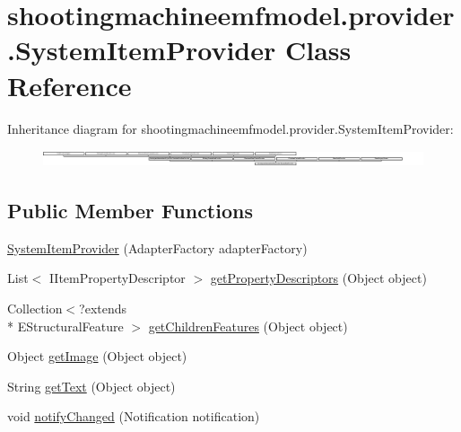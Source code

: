\hypertarget{classshootingmachineemfmodel_1_1provider_1_1_system_item_provider}{\section{shootingmachineemfmodel.\-provider.\-System\-Item\-Provider Class Reference}
\label{classshootingmachineemfmodel_1_1provider_1_1_system_item_provider}
}
Inheritance diagram for shootingmachineemfmodel.\-provider.\-System\-Item\-Provider\-:\begin{figure}[H]
\begin{center}
\leavevmode
\includegraphics[height=0.499109cm]{classshootingmachineemfmodel_1_1provider_1_1_system_item_provider}
\end{center}
\end{figure}
\subsection*{Public Member Functions}
\begin{DoxyCompactItemize}
\item 
\hyperlink{classshootingmachineemfmodel_1_1provider_1_1_system_item_provider_afd774c9d5a71bb4c976f74e50450c78a}{System\-Item\-Provider} (Adapter\-Factory adapter\-Factory)
\item 
List$<$ I\-Item\-Property\-Descriptor $>$ \hyperlink{classshootingmachineemfmodel_1_1provider_1_1_system_item_provider_a311eec6278a73e0b2231071144ada0c0}{get\-Property\-Descriptors} (Object object)
\item 
Collection$<$?extends \\*
E\-Structural\-Feature $>$ \hyperlink{classshootingmachineemfmodel_1_1provider_1_1_system_item_provider_af0894887fa3e78ffae020bc3576cc0a2}{get\-Children\-Features} (Object object)
\item 
Object \hyperlink{classshootingmachineemfmodel_1_1provider_1_1_system_item_provider_ab9e876cd2879a7bfae08161a223b4c4e}{get\-Image} (Object object)
\item 
String \hyperlink{classshootingmachineemfmodel_1_1provider_1_1_system_item_provider_aa924b908451ad624f13927ef390265b3}{get\-Text} (Object object)
\item 
void \hyperlink{classshootingmachineemfmodel_1_1provider_1_1_system_item_provider_aa590bdbcf527d3264a8d2905f61c060c}{notify\-Changed} (Notification notification)
\end{DoxyCompactItemize}
